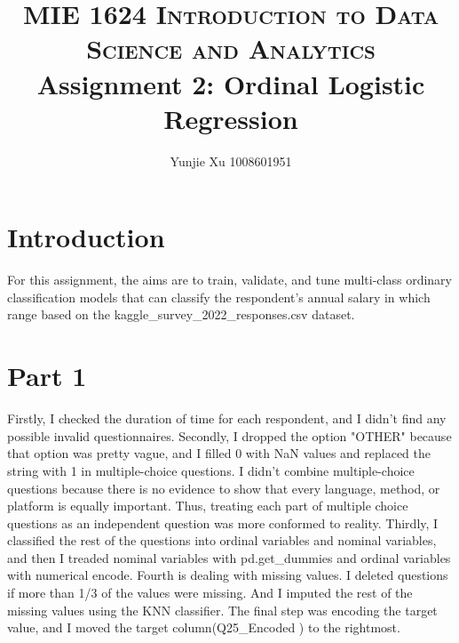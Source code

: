 \documentclass[10pt,onecolumn,letterpaper]{article}
\title{
		\usefont{OT1}{bch}{b}{n}
		\normalfont \normalsize \textsc{MIE 1624 Introduction to Data Science and Analytics} \\ [10pt]
		\huge Assignment 2: Ordinal Logistic Regression \\
}
\author{Yunjie Xu 1008601951}
\affil{\small{Department of Mechanical and Industrial Engineering, University of Toronto}}
\begin{document}
\maketitle




\section*{Introduction}
For this assignment, the aims are to train, validate, and tune multi-class ordinary classification models that can classify the respondent's annual salary in which range based on the kaggle\_survey\_2022\_responses.csv dataset.


\section*{Part 1}
Firstly, I checked the duration of time for each respondent, and I didn't find any possible invalid questionnaires. Secondly, I dropped the option "OTHER" because that option was pretty vague, and I filled 0 with NaN values and replaced the string with 1 in multiple-choice questions. I didn't combine multiple-choice questions because there is no evidence to show that every language, method, or platform is equally important. Thus, treating each part of multiple choice questions as an independent question was more conformed to reality. Thirdly, I classified the rest of the questions into ordinal variables and nominal variables, and then I treaded nominal variables with pd.get\_dummies and ordinal variables with numerical encode. Fourth is dealing with missing values. I deleted questions if more than 1/3 of the values were missing. And I imputed the rest of the missing values using the KNN classifier. The final step was encoding the target value, and I moved the target column(Q25\_Encoded ) to the rightmost.
\end{document}

